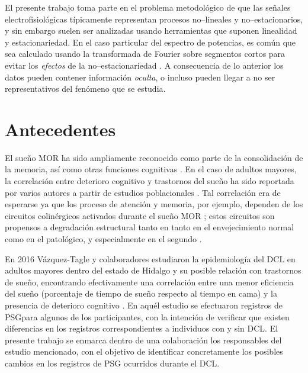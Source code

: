 El presente trabajo toma parte en el problema metodológico de que las señales 
electrofisiológicas típicamente representan procesos no--lineales y no--estacionarios, y sin 
embargo suelen ser analizadas usando herramientas que suponen linealidad y estacionariedad.
%
En el caso particular del espectro de potencias, es común que sea calculado usando la 
transformada de Fourier sobre segmentos cortos para evitar los \textit{efectos} de la 
no--estacionariedad \cite{Kaiser00}.
%
A consecuencia de lo anterior los datos pueden contener información \textit{oculta}, o incluso 
pueden llegar a no ser representativos del fenómeno que se estudia. 
%


\section{Antecedentes}

El sueño MOR ha sido ampliamente reconocido como parte de la consolidación de la memoria, así como
otras funciones cognitivas 
\cite{Fishbein1971,Fishbein1977,Lucero1970,Pearlman1971,Pearlman1974,Smith1991}.
%
En el caso de adultos mayores, la correlación entre deterioro cognitivo y trastornos del sueño ha 
sido reportada por varios autores a partir de estudios poblacionales 
\cite{Amer13,Miyata13,Reid06,Potvin12}.
%
Tal correlación era de esperarse ya que los proceso de atención y memoria, por ejemplo, dependen de 
los circuitos colinérgicos activados durante el sueño MOR \cite{Braun1997}; estos circuitos son 
propensos a degradación estructural tanto en tanto en el envejecimiento normal como en el 
patológico,  y especialmente en el segundo \cite{Schliebs11}.

En 2016 Vázquez-Tagle y colaboradores estudiaron la epidemiología del DCL en adultos mayores dentro 
del estado de Hidalgo y su posible relación con trastornos de sueño, encontrando efectivamente una 
correlación entre una menor eficiencia del sueño (porcentaje de tiempo de sueño respecto al tiempo 
en cama) y la presencia de deterioro cognitivo \cite{VazquezTagle16}.
%
En aquél estudio se efectuaron registros de PSGpara algunos de los participantes, con la intención 
de verificar que existen diferencias en los registros correspondientes a individuos con y sin DCL.
%
El presente trabajo se enmarca dentro de una colaboración los responsables del estudio mencionado, 
con el objetivo de identificar concretamente los posibles cambios en los registros de PSG 
ocurridos durante el DCL.

